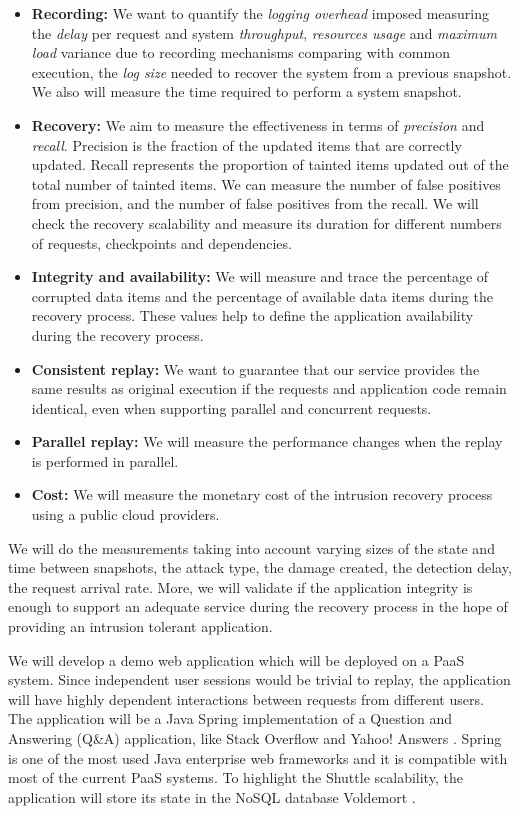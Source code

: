 \begin{itemize}
  \item \textbf{Recording:} We want to quantify the \textit{logging overhead} imposed measuring the \textit{delay} per request and system \textit{throughput}, \textit{resources usage} and \textit{maximum load} variance due to recording mechanisms comparing with common execution, the \textit{log size} needed to recover the system from a previous snapshot. We also will measure the time required to perform a system snapshot.
  \item \textbf{Recovery:} We aim to measure the effectiveness in terms of \textit{precision} and \textit{recall}. Precision is the fraction of the updated items that are correctly updated. Recall represents the proportion of tainted items updated out of the total number of tainted items. We can measure the number of false positives from precision, and the number of false positives from the recall. 
  We will check the recovery scalability and measure its duration for different numbers of requests, checkpoints and dependencies.
  \item \textbf{Integrity and availability:} We will measure and trace the percentage of corrupted data items and the percentage of available data items during the recovery process. These values help to define the application availability during the recovery process.
  \item \textbf{Consistent replay:} We want to guarantee that our service provides the same results as original execution if the requests and application code remain identical, even when supporting parallel and concurrent requests. 
  \item \textbf{Parallel replay:} We will measure the performance changes when the replay is performed in parallel.
  \item \textbf{Cost:} We will measure the monetary cost of the intrusion recovery process using a public cloud providers.
\end{itemize}

We will do the measurements taking into account varying sizes of the state and time between snapshots, the attack type, the damage created, the detection delay, the request arrival rate. More, we will validate if the application integrity is enough to support an adequate service during the recovery process in the hope of providing an intrusion tolerant application.

We will develop a demo web application which will be deployed on a PaaS system. Since independent user sessions would be trivial to replay, the application will have highly dependent interactions between requests from different users. The application will be a Java Spring \cite{spring} implementation of a Question and Answering (Q&A) application, like Stack Overflow \cite{stackoverflow} and Yahoo! Answers \cite{yahooAnswers}. Spring is one of the most used Java enterprise web frameworks and it is compatible with most of the current PaaS systems. To highlight the Shuttle scalability, the application will store its state in the NoSQL database Voldemort \cite{Kreps}.\\

